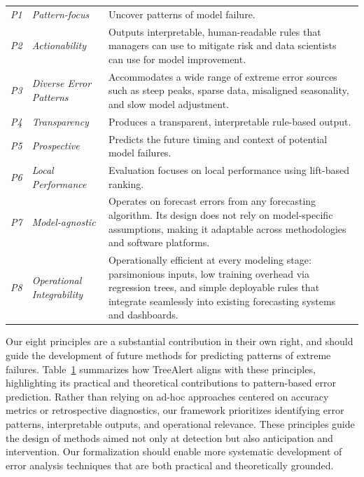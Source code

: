 \documentclass[]{interact}
\theoremstyle{plain}
\theoremstyle{definition}
\theoremstyle{remark}
\begin{document}
\begin{table}
{\begin{tabular}{p{0.6cm}p{2cm}p{10cm}} \toprule
\textit{P1} & \textit{Pattern-focus} & Uncover patterns of model failure. \\
\textit{P2} & \textit{Actionability} & Outputs interpretable, human-readable rules that managers can use to mitigate risk and data scientists can use for model improvement. \\
\textit{P3} & \textit{Diverse Error Patterns} & Accommodates a wide range of extreme error sources such as steep peaks, sparse data, misaligned seasonality, and slow model adjustment. \\
\textit{P4} & \textit{Transparency} & Produces a transparent, interpretable rule-based output. \\
\textit{P5} & \textit{Prospective} & Predicts the future timing and context of potential model failures. \\
\textit{P6} & \textit{Local \newline Performance} & Evaluation focuses on local performance using lift-based ranking. \\
\textit{P7} & \textit{Model-agnostic} & Operates on forecast errors from any forecasting algorithm. Its design does not rely on model-specific assumptions, making it adaptable across methodologies and software platforms. \\
\textit{P8} & \textit{Operational \newline Integrability} & Operationally efficient at every modeling stage: parsimonious inputs, low training overhead via regression trees, and simple deployable rules that integrate seamlessly into existing forecasting systems and dashboards. \\
\bottomrule
\end{tabular}}
\label{tab:design}
\end{table}

Our eight principles are a substantial contribution in their own right, and should guide the development of future methods for predicting patterns of extreme failures. Table~\ref{tab:design} summarizes how TreeAlert aligns with these principles, highlighting its practical and theoretical contributions to pattern-based error prediction. Rather than relying on ad-hoc approaches centered on accuracy metrics or retrospective diagnostics, our framework prioritizes identifying error patterns, interpretable outputs, and operational relevance. These principles guide the design of methods aimed not only at detection but also anticipation and intervention. Our formalization should enable more systematic development of error analysis techniques that are both practical and theoretically grounded.
\end{document}
